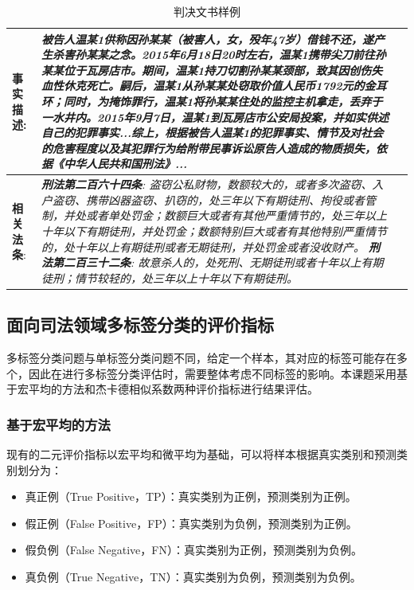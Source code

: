 \begin{table}[hbt]
    \caption{判决文书样例}
    \label{t:example}
    \centering
    \begin{tabular}{lp{12cm}p{7cm}}
    \hline
    \textbf{事实描述}: &\emph{被告人温某1供称因孙某某（被害人，女，殁年47岁）借钱不还，遂产生杀害孙某某之念。2015年6月18日20时左右，温某1携带尖刀前往孙某某位于瓦房店市。期间，温某1持刀切割孙某某颈部，致其因创伤失血性休克死亡。嗣后，温某1从孙某某处窃取价值人民币1792元的金耳环；同时，为掩饰罪行，温某1将孙某某住处的监控主机拿走，丢弃于一水井内。2015年9月7日，温某1到瓦房店市公安局投案，并如实供述自己的犯罪事实...综上，根据被告人温某1的犯罪事实、情节及对社会的危害程度以及其犯罪行为给附带民事诉讼原告人造成的物质损失，依据《中华人民共和国刑法》...}\\
    \hline
    \textbf{相关法条}: 
    &\emph{\textbf{刑法第二百六十四条}: 盗窃公私财物，数额较大的，或者多次盗窃、入户盗窃、携带凶器盗窃、扒窃的，处三年以下有期徒刑、拘役或者管制，并处或者单处罚金；数额巨大或者有其他严重情节的，处三年以上十年以下有期徒刑，并处罚金；数额特别巨大或者有其他特别严重情节的，处十年以上有期徒刑或者无期徒刑，并处罚金或者没收财产。 \newline
    \textbf{刑法第二百三十二条}: 故意杀人的，处死刑、无期徒刑或者十年以上有期徒刑；情节较轻的，处三年以上十年以下有期徒刑。}\\
    \hline
    \end{tabular}
\end{table}


\subsection{面向司法领域多标签分类的评价指标}
多标签分类问题与单标签分类问题不同，给定一个样本，其对应的标签可能存在多个，因此在进行多标签分类评估时，需要整体考虑不同标签的影响。本课题采用基于宏平均的方法和杰卡德相似系数两种评价指标进行结果评估。
\subsubsection{基于宏平均的方法}
现有的二元评价指标以宏平均和微平均为基础，可以将样本根据真实类别和预测类别划分为：
\begin{itemize}
    \item 真正例（True Positive，TP）：真实类别为正例，预测类别为正例。
    \item 假正例（False Positive，FP）：真实类别为负例，预测类别为正例。
    \item 假负例（False Negative，FN）：真实类别为正例，预测类别为负例。
    \item 真负例（True Negative，TN）：真实类别为负例，预测类别为负例。
\end{itemize}

